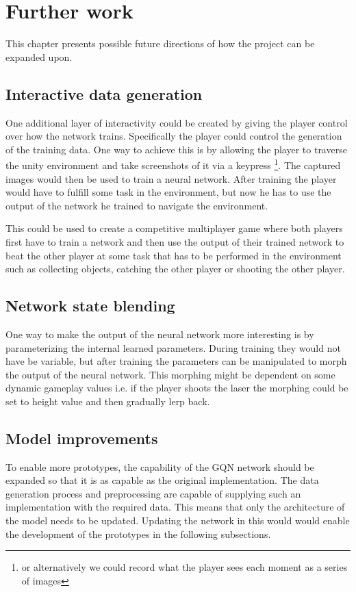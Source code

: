 
\chapter{Further work}\label{FurtherWork}
This chapter presents possible future directions of how the project can be expanded upon.


\section{Interactive data generation}
One additional layer of interactivity could be created by giving the player control over how the network trains. Specifically the player could control the generation of the training data. One way to achieve this is by allowing the player to traverse the unity environment and take screenshots of it via a keypress \footnote{or alternatively we could record what the player sees each moment as a series of images}. The captured images would then be used to train a neural network. After training the player would have to fulfill some task in the environment, but now he has to use the output of the network he trained to navigate the environment.

This could be used to create a competitive multiplayer game where both players first have to train a network and then use the output of their trained network to beat the other player at some task that has to be performed in the environment such as collecting objects, catching the other player or shooting the other player.


\section{Network state blending}
One way to make the output of the neural network more interesting is by parameterizing the internal learned parameters. During training they would not have be variable, but after training the parameters can be manipulated to morph the output of the neural network. This morphing might be dependent on some dynamic gameplay values i.e. if the player shoots the laser the morphing could be set to height value and then gradually lerp back.


\section{Model improvements}
To enable more prototypes, the capability of the GQN network should be expanded so that it is as capable as the original implementation. The data generation process and preprocessing are capable of supplying such an implementation with the required data. This means that only the architecture of the model needs to be updated. Updating the network in this would would enable the development of the prototypes in the following subsections.


